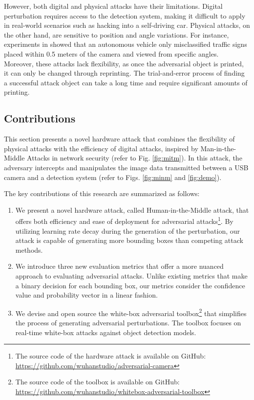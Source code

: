 However, both digital and physical attacks have their limitations. Digital perturbation requires access to the detection system, making it difficult to apply in real-world scenarios such as hacking into a self-driving car. Physical attacks, on the other hand, are sensitive to position and angle variations. For instance, experiments in \citep{LuSFF17} showed that an autonomous vehicle only misclassified traffic signs placed within 0.5 meters of the camera and viewed from specific angles. Moreover, these attacks lack flexibility, as once the adversarial object is printed, it can only be changed through reprinting. The trial-and-error process of finding a successful attack object can take a long time and require significant amounts of printing.

\subsection{Contributions}

This section presents a novel hardware attack that combines the flexibility of physical attacks with the efficiency of digital attacks, inspired by Man-in-the-Middle Attacks in network security (refer to Fig. \ref{fig:mitm}). In this attack, the adversary intercepts and manipulates the image data transmitted between a USB camera and a detection system (refer to Figs. \ref{fig:minm} and \ref{fig:demo}). 

The key contributions of this research are summarized as follows:

\begin{enumerate}
    \item We present a novel hardware attack, called Human-in-the-Middle  attack, that offers both efficiency and ease of deployment for adversarial attacks\footnote{The source code of the hardware attack is available on GitHub: \url{https://github.com/wuhanstudio/adversarial-camera}}. By utilizing learning rate decay during the generation of the perturbation, our attack is capable of generating more bounding boxes than competing attack methods.
    \item We introduce three new evaluation metrics that offer a more nuanced approach to evaluating adversarial attacks. Unlike existing metrics that make a binary decision for each bounding box, our metrics consider the confidence value and probability vector in a linear fashion.
    \item We devise and open source the white-box adversarial toolbox\footnote{The source code of the toolbox is available on GitHub: \url{https://github.com/wuhanstudio/whitebox-adversarial-toolbox}} that simplifies the process of generating adversarial perturbations. The toolbox focuses on real-time white-box attacks against object detection models.
\end{enumerate}

